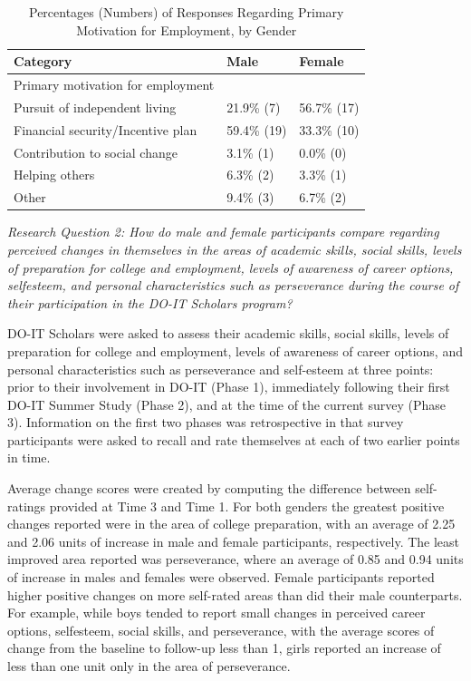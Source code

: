 \documentclass[11.5pt]{sig-alternate} %
\begin{document}
\begin{large}
\begin{table}[th]
\caption{Percentages (Numbers) of Responses Regarding Primary Motivation for Employment, by Gender}
\begin{tabular}{lll}
\hline
Category & Male & Female \\ \hline
Primary motivation for employment & & \\
\hspace{2em} Pursuit of independent living & 21.9\% (7) & 56.7\% (17) \\
\hspace{2em} Financial security/Incentive plan & 59.4\% (19) & 33.3\% (10) \\
\hspace{2em} Contribution to social change & 3.1\% (1) & 0.0\% (0) \\
\hspace{2em} Helping others & 6.3\% (2) & 3.3\% (1) \\
\hspace{2em} Other & 9.4\% (3) & 6.7\% (2) \\ \hline
\end{tabular}
\end{table}
 
\textit{Research Question 2: How do male and female participants compare regarding perceived changes in themselves in the areas of academic skills, social skills, levels of preparation for college and employment, levels of awareness of career options, selfesteem, and personal characteristics such as perseverance during the course of their participation in the DO-IT Scholars program? }
 
DO-IT Scholars were asked to assess their academic skills, social skills, levels of preparation for college and employment, levels of awareness of career options, and personal characteristics such as perseverance and self-esteem at three points: prior to their involvement in DO-IT (Phase 1), immediately following their first DO-IT Summer Study (Phase 2), and at the time of the current survey (Phase 3). Information on the first two phases was retrospective in that survey participants were asked to recall and rate themselves at each of two earlier points in time.  
 
Average change scores were created by computing the difference between self-ratings provided at Time 3 and Time 1. For both genders the greatest positive changes reported were in the area of college preparation, with an average of 2.25 and 2.06 units of increase in male and female participants, respectively. The least improved area reported was perseverance, where an average of 0.85 and 0.94 units of increase in males and females were observed. Female participants reported higher positive changes on more self-rated areas than did their male counterparts. For example, while boys tended to report small changes in perceived career options, selfesteem, social skills, and perseverance, with the average scores of change from the baseline to follow-up less than 1, girls reported an increase of less than one unit only in the area of perseverance. 
 

\end{large}
\end{document}
